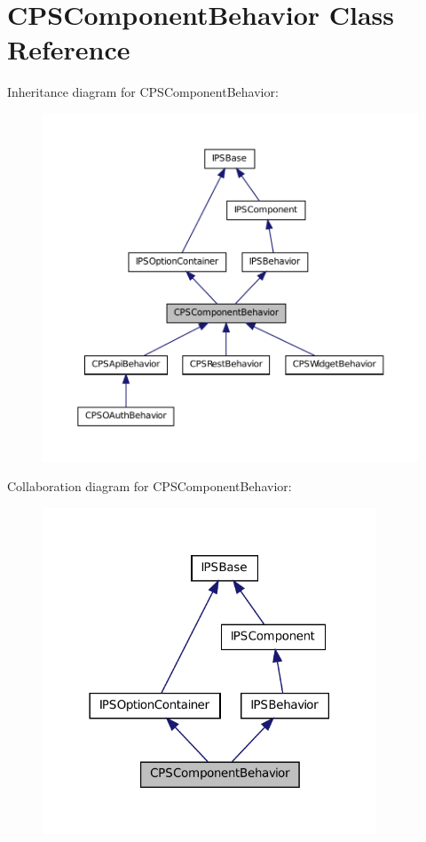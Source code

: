 \hypertarget{classCPSComponentBehavior}{
\section{CPSComponentBehavior Class Reference}
\label{classCPSComponentBehavior}
}


Inheritance diagram for CPSComponentBehavior:\nopagebreak
\begin{figure}[H]
\begin{center}
\leavevmode
\includegraphics[width=400pt]{classCPSComponentBehavior__inherit__graph}
\end{center}
\end{figure}


Collaboration diagram for CPSComponentBehavior:\nopagebreak
\begin{figure}[H]
\begin{center}
\leavevmode
\includegraphics[width=282pt]{classCPSComponentBehavior__coll__graph}
\end{center}
\end{figure}


